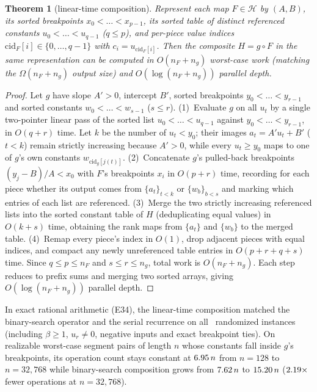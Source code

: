 \documentclass[10pt]{article}
\newtheorem{theorem}{Theorem}
\theoremstyle{remark}
\begin{document}
\begin{theorem}[linear-time composition]
\label{thm:linearcompose}
Represent each map $F\in\mathcal H$ by $(A,B)$, its sorted breakpoints $x_0<\dots<x_{p-1}$, its sorted table of distinct referenced constants $u_0<\dots<u_{q-1}$ ($q\le p$), and per-piece value indices $\mathrm{cid}_F[i]\in\{0,\dots,q-1\}$ with $c_i=u_{\mathrm{cid}_F[i]}$. Then the composite $H=g\circ F$ in the same representation can be computed in $O(n_F+n_g)$ worst-case work (matching the $\Omega(n_F+n_g)$ output size) and $O(\log(n_F+n_g))$ parallel depth.
\end{theorem}
\begin{proof}
Let $g$ have slope $A'>0$, intercept $B'$, sorted breakpoints $y_0<\dots<y_{r-1}$ and sorted constants $w_0<\dots<w_{s-1}$ ($s\le r$).
(1)~Evaluate $g$ on all $u_t$ by a single two-pointer linear pass of the sorted list $u_0<\dots<u_{q-1}$ against $y_0<\dots<y_{r-1}$, in $O(q+r)$ time. Let $k$ be the number of $u_t<y_0$; their images $a_t=A'u_t+B'$ ($t<k$) remain strictly increasing because $A'>0$, while every $u_t\ge y_0$ maps to one of $g$'s own constants $w_{\mathrm{cid}_g[j(t)]}$.
(2)~Concatenate $g$'s pulled-back breakpoints $(y_j-B)/A<x_0$ with $F$'s breakpoints $x_i$ in $O(p+r)$ time, recording for each piece whether its output comes from $\{a_t\}_{t<k}$ or $\{w_b\}_{b<s}$ and marking which entries of each list are referenced.
(3)~Merge the two strictly increasing referenced lists into the sorted constant table of $H$ (deduplicating equal values) in $O(k+s)$ time, obtaining the rank maps from $\{a_t\}$ and $\{w_b\}$ to the merged table.
(4)~Remap every piece's index in $O(1)$, drop adjacent pieces with equal indices, and compact any newly unreferenced table entries in $O(p+r+q+s)$ time.
Since $q\le p\le n_F$ and $s\le r\le n_g$, total work is $O(n_F+n_g)$. Each step reduces to prefix sums and merging two sorted arrays, giving $O(\log(n_F+n_g))$ parallel depth.
\end{proof}

In exact rational arithmetic (E34), the linear-time composition matched the binary-search operator and the serial recurrence on all \LinCompTrials\ randomized instances (including $\beta\ge 1$, $u_r\neq 0$, negative inputs and exact breakpoint ties). On realizable worst-case segment pairs of length $n$ whose constants fall inside $g$'s breakpoints, its operation count stays constant at $6.95\,n$ from $n=128$ to $n=32{,}768$ while binary-search composition grows from $7.62\,n$ to $15.20\,n$ ($2.19\times$ fewer operations at $n=32{,}768$).
\end{document}

